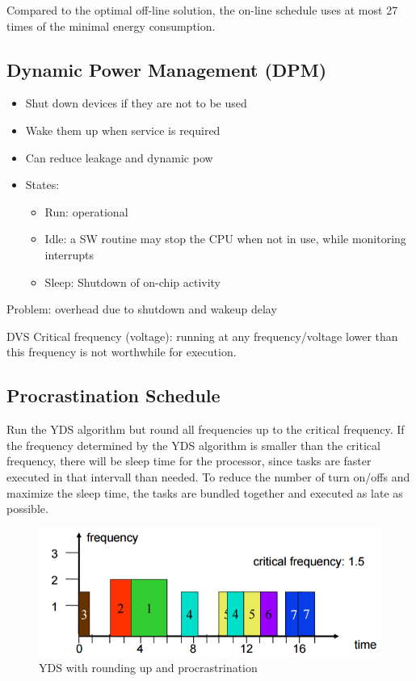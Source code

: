 \begin{theorem}
Compared to the optimal off-line solution, the on-line schedule uses at most 27 times of the minimal energy consumption.
\end{theorem}


\subsection{Dynamic Power Management (DPM)}


\begin{itemize}[noitemsep]
\item Shut down devices if they are not to be used
\item Wake them up when service is required
\item Can reduce leakage and dynamic pow
\item States:
	\begin{itemize}
		\item Run: operational
		\item Idle: a SW routine may stop the CPU when not in use, while monitoring interrupts
		\item Sleep: Shutdown of on-chip activity
	\end{itemize}
\end{itemize}

Problem: overhead due to shutdown and wakeup delay

\begin{definition}
DVS Critical frequency (voltage): running at any frequency/voltage lower than this frequency is not worthwhile for execution.
\end{definition}

\subsection{Procrastination Schedule}
Run the YDS algorithm but round all frequencies up to the critical frequency. If the frequency determined by the YDS algorithm is smaller than the critical frequency, there will be sleep time for the processor, since tasks are faster executed in that intervall than needed. To reduce the number of turn on/offs and maximize the sleep time, the tasks are bundled together and executed as late as possible.

\begin{figure}[ht]
	\centering
  	\includegraphics[scale=0.4]{img/9_yds_procrast.png}
	\caption{YDS with rounding up and procrastrination}
	\label{fig_yds_procrast}
\end{figure}


\cleardoublepage

